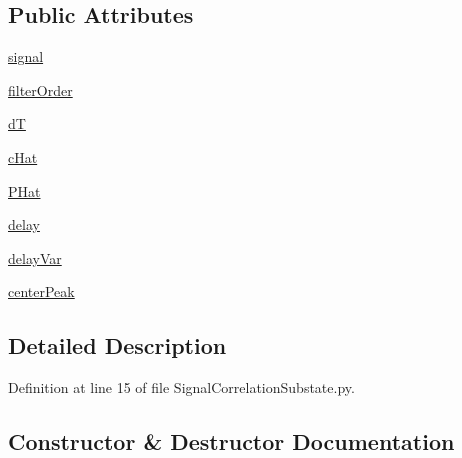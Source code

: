 \subsection*{Public Attributes}
\begin{DoxyCompactItemize}
\item 
\hyperlink{classSignalCorrelationSubstate_1_1CorrelationFilter_aa8d4b67731322e27598866d1cec84877}{signal}
\item 
\hyperlink{classSignalCorrelationSubstate_1_1CorrelationFilter_a4b49b7bd52c1346cca0342942a5bbbb6}{filter\+Order}
\item 
\hyperlink{classSignalCorrelationSubstate_1_1CorrelationFilter_a500e4823c314d54a21f236b6b896c8eb}{dT}
\item 
\hyperlink{classSignalCorrelationSubstate_1_1CorrelationFilter_ad07b1d484b9ab77a1a8fc215f10faf15}{c\+Hat}
\item 
\hyperlink{classSignalCorrelationSubstate_1_1CorrelationFilter_a9b079080abde4a661f95687e8ea89827}{P\+Hat}
\item 
\hyperlink{classSignalCorrelationSubstate_1_1CorrelationFilter_ae32dc6df9ef5f56e5238cb79dded0681}{delay}
\item 
\hyperlink{classSignalCorrelationSubstate_1_1CorrelationFilter_a34d52beb18c131f2305689d48f612a5a}{delay\+Var}
\item 
\hyperlink{classSignalCorrelationSubstate_1_1CorrelationFilter_a8e53182c2ff431a6a545a265cda6ba48}{center\+Peak}
\end{DoxyCompactItemize}


\subsection{Detailed Description}


Definition at line 15 of file Signal\+Correlation\+Substate.\+py.



\subsection{Constructor \& Destructor Documentation}
